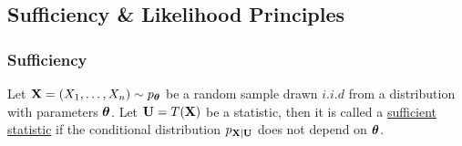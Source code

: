\subsection{Sufficiency \& Likelihood Principles}
\newcommand{\FacT}{\hyperref[thm:factorisation_theorem]{(\mathrm{{\bf FacT}})}}

\subsubsection{Sufficiency}
\begin{definition}
    Let ${\bf X} = (X_1, \dots, X_n) \sim p_{\boldsymbol{\theta}}$ be a random sample drawn $i.i.d$ from a distribution with parameters $\boldsymbol{\theta}$. Let ${\bf U}=T({\bf X})$ be a statistic, then it is called a \underline{sufficient statistic} if the conditional distribution $p_{{\bf X}|{\bf U}}$ does not depend on $\boldsymbol{\theta}$.
\end{definition}

